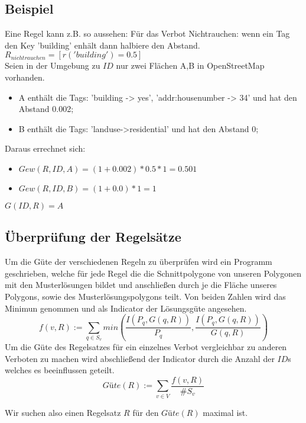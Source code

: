 \subsection{Beispiel}
Eine Regel kann z.B. so aussehen:
Für das Verbot Nichtrauchen: wenn ein Tag den Key 'building' enhält dann halbiere den Abstand. \\
$R_{nichtrauchen} = [r('building') = 0.5]$\\
\newline
Seien in der Umgebung zu $ID$ nur zwei Flächen A,B in OpenStreetMap vorhanden.
\begin{itemize}
\item A enthält die Tags: 'building -> yes', 'addr:housenumber -> 34' und hat den Abstand 0.002;
\item B enthält die Tags: 'landuse->residential' und hat den Abstand 0;
\end{itemize}
Daraus errechnet sich:
\begin{itemize}
\item $Gew(R,ID,A) = (1+0.002) * 0.5 * 1 = 0.501$
\item $Gew(R,ID,B) = (1+0.0) * 1 = 1$
\end{itemize}

$G(ID,R) = A$

\subsection{Überprüfung der Regelsätze}
Um die Güte der verschiedenen Regeln zu überprüfen wird ein Programm geschrieben, welche für jede Regel die die Schnittpolygone von unseren Polygonen mit
den Musterlösungen bildet und anschließen durch je die Fläche unseres Polygons, sowie des Musterlösungspolygons teilt.
Von beiden Zahlen wird das Minimun genommen und als Indicator der Lösungsgüte angesehen.\\
\begin{equation}
f(v,R) := \sum_{q\in S_v} min(\frac{I(P_q,G(q,R))}{P_q},\frac{I(P_q,G(q,R))}{G(q,R)})
\end{equation}
Um die Güte des Regelsatzes für ein einzelnes Verbot vergleichbar zu anderen Verboten zu machen wird abschließend der Indicator durch
die Anzahl der $ID$s welches es beeinflussen geteilt.\\
\begin{equation}
\label{eq:guete}
Güte(R) := \sum_{v \in V} \frac{ f(v,R)}{\#S_v}
\end{equation}

Wir suchen also einen Regelsatz $R$ für den $Güte(R)$ maximal ist.

